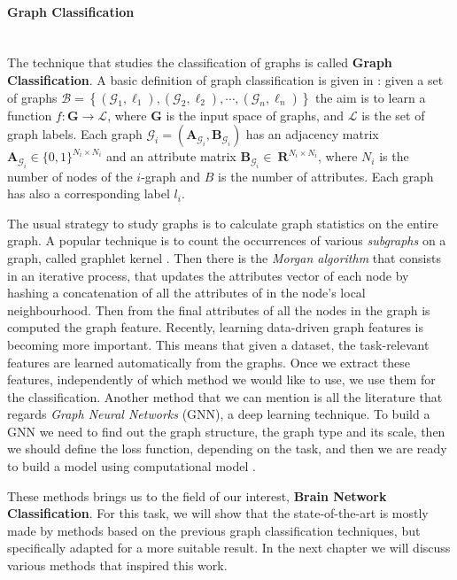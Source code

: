 \paragraph{Graph Classification}\
\\
The technique that studies the classification of graphs is called \textbf{Graph Classification}. A basic definition of graph classification is given in \cite{10.1145/3219819.3219980}: given a set of graphs $\mathcal{B}=\left\{\left(\mathcal{G}_{1}, \ell_{1}\right),\left(\mathcal{G}_{2}, \ell_{2}\right), \cdots,\left(\mathcal{G}_{n}, \ell_{n}\right)\right\}$ the aim is to learn a function $f: \mathbf{G} \rightarrow \mathcal{L}$, where $\mathbf{G}$ is the input space of graphs, and $\mathcal{L}$ is the set of graph labels. Each graph $\mathcal{G}_{i}=\left(\mathbf{A}_{\mathcal{G}_{i}}, \mathbf{B}_{\mathcal{G}_{i}}\right)$ has an adjacency matrix $\mathbf{A}_{\mathcal{G}_{i}} \in\{0,1\}^{N_{i} \times N_{i}}$ and an attribute matrix $\mathbf{B}_{\mathcal{G}_{i}} \in\ \mathbf{R}^{N_{i} \times N_{i}}$, where ${N}_{i}$ is the number of nodes of the $i$-graph and $B$ is the number of attributes. Each graph has also a corresponding label $l_{i}$. 	

The usual strategy to study graphs is to calculate graph statistics on the entire graph. A popular technique is to count the occurrences of various \textit{subgraphs} on a graph, called graphlet kernel \cite{pmlr-v5-shervashidze09a}. Then there is the \textit{Morgan algorithm} \cite{Rogers2010ECFP} that consists in an iterative process, that updates the attributes vector of each node by hashing a concatenation of all the attributes of in the node's local neighbourhood. Then from the final attributes of all the nodes in the graph is computed the graph feature. Recently, learning data-driven graph features \cite{NIPS2015_f9be311e} is becoming more important. This means that given a dataset, the task-relevant features are learned automatically from the graphs. Once we extract these features, independently of which method we would like to use, we use them for the classification.
Another method that we can mention is all the literature that regards \textit{Graph Neural Networks} (GNN), a deep learning technique. To build a GNN we need to find out the graph structure, the graph type and its scale, then we should define the loss function, depending on the task, and then we are ready to build a model using computational model \cite{ZHOU202057}. 

These methods brings us to the field of our interest, \textbf{Brain Network Classification}. For this task, we will show that the state-of-the-art is mostly made by methods based on the previous graph classification techniques, but specifically adapted for a more suitable result. In the next chapter we will discuss various methods that inspired this work.